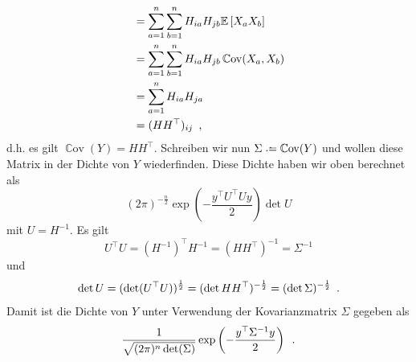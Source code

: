 \documentclass[ngerman, a4paper, 11pt]{article}
\theoremstyle{plain}
\theoremstyle{plain}
\theoremstyle{proofstyle}
\renewcommand{\Cov}{\operatorname{\mathbb Cov}}
\newcommand{\satzende}{\enskip \text{.}}
\newcommand{\komma}{\enskip \text{,}}
\begin{document}
\begin{exercisePage}
\begin{enumerate}[label=(\alph*), leftmargin=*]
\begin{align*}
		&=\sum_{a=1}^n  \sum_{b=1}^n H_{ia} H_{jb} \EW[X_a X_b] \\
		&=\sum_{a=1}^n  \sum_{b=1}^n H_{ia} H_{jb} \Cov( X_a, X_b ) \\
		&=\sum_{a=1}^n H_{ia} H_{ja} \\
		&=(H H^\top)_{ij} \komma
	\end{align*}
	d.h. es gilt $\Cov(Y) = H H^\top$. Schreiben wir nun $\Sigma \defeq \Cov(Y)$ und wollen diese Matrix in der Dichte von $Y$ wiederfinden.
	Diese Dichte haben wir oben berechnet als 
	\begin{equation*}
		(2 \pi)^{-\frac{n}{2}} \exp \left( -\frac{{ y}^\top U^\top U { y}}{2} \right) \det{U}
	\end{equation*}
	mit $U = H^{-1}$. Es gilt
	\begin{equation*}
		U^\top U=(H^{-1})^\top H^{-1} = (H H^\top)^{-1}=\Sigma^{-1}
	\end{equation*}
	und
	\begin{equation*}
		\det U=(\det (U^\top U))^{\frac{1}{2}}=(\det H H^\top)^{-\frac{1}{2}}=(\det \Sigma)^{-\frac{1}{2}} \satzende
	\end{equation*}	
	Damit ist die Dichte von $ Y$ unter Verwendung der Kovarianzmatrix $\Sigma$ gegeben als
	\begin{equation*}
		\frac{1}{\sqrt{(2\pi)^n \det(\Sigma)}} \exp \left( -\frac{{ y}^\top \Sigma^{-1} { y}}{2} \right) \satzende
	\end{equation*}
	

\end{enumerate}
\end{exercisePage}
\end{document}
